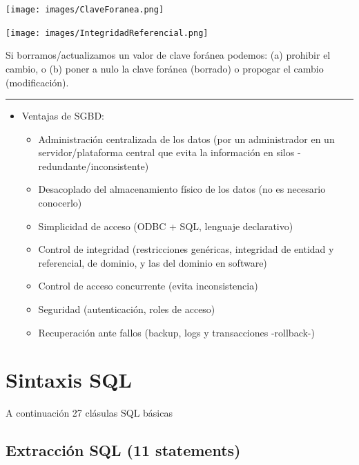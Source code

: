 \documentclass[]{book}
\providecommand{\tightlist}{%
  \setlength{\itemsep}{0pt}\setlength{\parskip}{0pt}}
\begin{document}
\texttt{[image: images/ClaveForanea.png]}

\texttt{[image: images/IntegridadReferencial.png]}

Si borramos/actualizamos un valor de clave foránea podemos: (a) prohibir el cambio, o (b) poner a nulo la clave foránea (borrado) o propogar el cambio (modificación).

\begin{center}\rule{0.5\linewidth}{\linethickness}\end{center}

\begin{itemize}
\tightlist
\item
  Ventajas de SGBD:

  \begin{itemize}
  \tightlist
  \item
    Administración centralizada de los datos (por un administrador en un servidor/plataforma central que evita la información en silos -redundante/inconsistente)
  \item
    Desacoplado del almacenamiento físico de los datos (no es necesario conocerlo)
  \item
    Simplicidad de acceso (ODBC + SQL, lenguaje declarativo)
  \item
    Control de integridad (restricciones genéricas, integridad de entidad y referencial, de dominio, y las del dominio en software)
  \item
    Control de acceso concurrente (evita inconsistencia)
  \item
    Seguridad (autenticación, roles de acceso)
  \item
    Recuperación ante fallos (backup, logs y transacciones -rollback-)
  \end{itemize}
\end{itemize}

\hypertarget{sintaxis-sql}{%
\section{Sintaxis SQL}\label{sintaxis-sql}}

A continuación 27 clásulas SQL básicas

\hypertarget{extraccion-sql-11-statements}{%
\subsection{Extracción SQL (11 statements)}\label{extraccion-sql-11-statements}}
\end{document}

